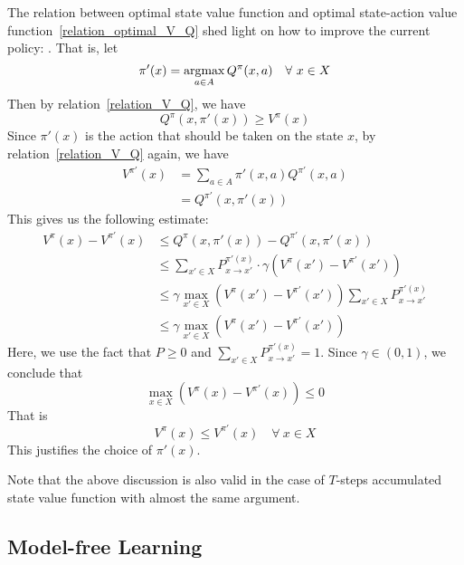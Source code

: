 The relation between optimal state value function and optimal state-action value 
function~\eqref{relation_optimal_V_Q} shed light on how to improve the current policy: . That is, let 
\begin{equation}
\pi'(x) = \operatorname*{argmax}_{a \in A}Q^\pi(x, a)\quad\forall~x \in X
\end{equation}
Then by relation~\eqref{relation_V_Q}, we have
$$Q^\pi(x, \pi'(x)) \geq V^\pi(x)$$
Since $\pi'(x)$ is the action that should be taken on the state $x$, by relation~\eqref{relation_V_Q} again, 
we have
\begin{align*}
    V^{\pi'}(x) &= \sum_{a \in A}\pi'(x, a) Q^{\pi'}(x, a)\\
              &= Q^{\pi'}(x, \pi'(x))
\end{align*}
This gives us the following estimate:
\begin{align*}
    V^\pi(x) - V^{\pi'}(x) &\leq Q^\pi(x, \pi'(x)) - Q^{\pi'}(x, \pi'(x))\\
                           &\leq \sum_{x' \in X}P_{x \rightarrow x'}^{\pi'(x)}\cdot\gamma\left(V^\pi(x') - 
                           V^{\pi'}(x')\right)\\
                           &\leq \gamma \max_{x' \in X}\left(V^\pi(x') - V^{\pi'}(x')\right)\sum_{x' \in X}
                           P_{x \rightarrow x'}^{\pi'(x)}\\
                           &\leq \gamma \max_{x' \in X}\left(V^\pi(x') - V^{\pi'}(x')\right)
\end{align*}
Here, we use the fact that $P \geq 0$ and $\sum_{x' \in X}P_{x \rightarrow x'}^{\pi'(x)} = 1$. Since
$\gamma \in (0, 1)$, we conclude that
$$\max_{x \in X}\left(V^\pi(x) - V^{\pi'}(x)\right) \leq 0$$
That is 
$$V^\pi(x) \leq V^{\pi'}(x)\quad\forall~x \in X$$
This justifies the choice of $\pi'(x)$.
\begin{re}
    Note that the above discussion is also valid in the case of $T$-steps accumulated state value function
    with almost the same argument.
\end{re}



\subsection{Model-free Learning}